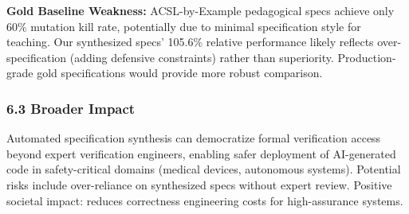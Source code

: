 \textbf{Gold Baseline Weakness:} ACSL-by-Example pedagogical specs achieve only 60\% mutation kill rate, potentially due to minimal specification style for teaching. Our synthesized specs' 105.6\% relative performance likely reflects over-specification (adding defensive constraints) rather than superiority. Production-grade gold specifications would provide more robust comparison.

\subsubsection{6.3 Broader Impact}

Automated specification synthesis can democratize formal verification access beyond expert verification engineers, enabling safer deployment of AI-generated code in safety-critical domains (medical devices, autonomous systems). Potential risks include over-reliance on synthesized specs without expert review. Positive societal impact: reduces correctness engineering costs for high-assurance systems.
